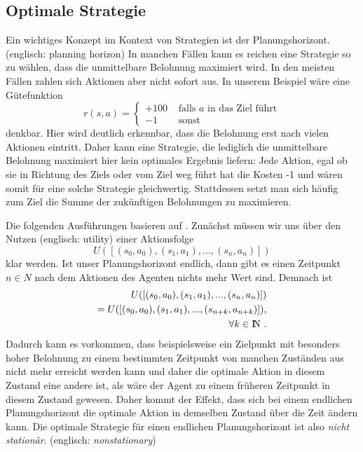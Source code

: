 \documentclass[a4paper]{IEEEtran}
\def\IN{\mathrm{I\hspace{-2pt}N}} %
\begin{document}
\subsection{Optimale Strategie}
Ein wichtiges Konzept im Kontext von Strategien ist der Planungshorizont. (englisch: planning horizon) In manchen Fällen kann es reichen eine Strategie so zu wählen, dass die unmittelbare Belohnung maximiert wird. In den meisten Fällen zahlen sich Aktionen aber nicht sofort aus. In unserem Beispiel wäre eine Gütefunktion
\begin{equation}
	r(s,a) = \left\{ \begin{array}{rl}
		+100 &\mbox{ falls $a$ in das Ziel führt} \\
		-1 &\mbox{ sonst}
       \end{array} \right.
\end{equation}
denkbar. Hier wird deutlich erkennbar, dass die Belohnung erst nach vielen Aktionen eintritt. Daher kann eine Strategie, die lediglich die unmittelbare Belohnung maximiert hier kein optimales Ergebnis liefern: Jede Aktion, egal ob sie in Richtung des Ziels oder vom Ziel weg führt hat die Kosten -1 und wären somit für eine solche Strategie gleichwertig.
Stattdessen setzt man sich häufig zum Ziel die Summe der zukünftigen Belohnungen zu maximieren.

Die folgenden Ausführungen basieren auf \cite{russell1995artificial}. Zunächst müssen wir uns über den Nutzen (englisch: utility) einer Aktionsfolge 
\begin{equation}
	U([(s_0, a_0), (s_1, a_1), ..., (s_n, a_n)])
\end{equation}
klar werden. Ist unser Planungshorizont endlich, dann gibt es einen Zeitpunkt $n \in N$ nach dem Aktionen des Agenten nichts mehr Wert sind. Demnach ist 
\begin{equation}
	\begin{split}
		U([ (s_0, a_0), (s_1, a_1), ..., (s_n, a_n)]) \\
		= U([ (s_0, a_0), (s_1, a_1), ..., (s_{n+k}, a_{n+k})]),\\
		\forall k \in \IN \ .
	\end{split}
\end{equation}
Dadurch kann es vorkommen, dass beispielsweise ein Zielpunkt mit besonders hoher Belohnung zu einem bestimmten Zeitpunkt von manchen Zuständen aus nicht mehr erreicht werden kann und daher die optimale Aktion in diesem Zustand eine andere ist, als wäre der Agent zu einem früheren Zeitpunkt in diesem Zustand gewesen. Daher kommt der Effekt, dass sich bei einem endlichen Planungshorizont die optimale Aktion in demselben Zustand über die Zeit ändern kann. Die optimale Strategie für einen endlichen Planungshorizont ist also \emph{nicht stationär}. (englisch: \emph{nonstationary})
\end{document}
